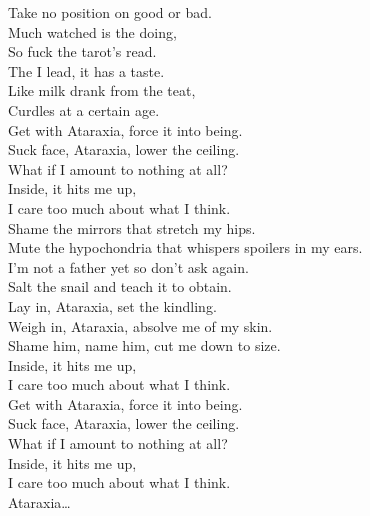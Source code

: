 



Take no position on good or bad. \\
Much watched is the doing, \\
So fuck the tarot's read. \\
The  I lead, it has a taste. \\
Like milk drank from the teat, \\
Curdles at a certain age. \\

Get with Ataraxia, force it into being. \\
Suck face, Ataraxia, lower the ceiling. \\
What if I amount to nothing at all? \\
Inside, it hits me up, \\
I care too much about what I think. \\

Shame the mirrors that stretch my hips. \\
Mute the hypochondria that whispers spoilers in my ears. \\
I'm not a father yet so don't ask again. \\
Salt the snail and teach it to obtain. \\

Lay in, Ataraxia, set the kindling. \\
Weigh in, Ataraxia, absolve me of my skin. \\
Shame him, name him, cut me down to size. \\
Inside, it hits me up, \\
I care too much about what I think. \\

Get with Ataraxia, force it into being. \\
Suck face, Ataraxia, lower the ceiling. \\
What if I amount to nothing at all? \\
Inside, it hits me up, \\
I care too much about what I think. \\

Ataraxia… \\


